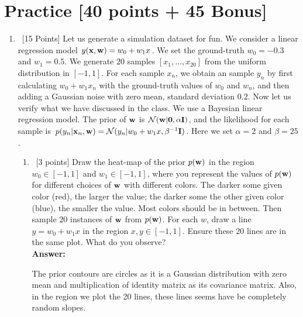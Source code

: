 \documentclass[12pt, fullpage,letterpaper]{article}
\def\red{\color{red}}
\def\blackblue{\color{black!40!blue}}
\begin{document}
\section*{Practice [40 points + 45 Bonus]}
\begin{enumerate}
	\item~[15 Points] Let us generate a simulation dataset for fun. We consider a linear regression model $y({\bf x}, {\bf w}) = w_0 + w_1 x$. We set the ground-truth $w_0 = -0.3$ and $w_1 = 0.5$. We generate $20$ samples $[x_1, \ldots, x_{20}]$ from the uniform distribution in $[-1, 1]$. For each sample $x_n$, we obtain an sample $y_n$ by first calculating $w_0 + w_1 x_n$ with the ground-truth values of $w_0$ and $w_n$, and then adding a Gaussian noise with zero mean, standard deviation $0.2$. Now let us verify what we have discussed in the class. We use a Bayesian linear regression model. The prior of ${\bf w}$ is $\mathcal{N}({\bf w}|{\bf 0}, \alpha {\bf I})$, and the likelihood for each sample is $p(y_n|{\bf x}_n, {\bf w}) = \mathcal{N}(y_n|w_0 + w_1x, \beta^{-1}{\bf I})$. Here we set $\alpha = 2$ and $\beta = 25$. 
	\begin{enumerate}
		\item~[3 points] Draw the heat-map of the prior $p({\bf w})$ in the region $w_0 \in [-1, 1]$ and $w_1 \in [-1, 1]$, where you represent the values of $p({\bf w})$ for different choices of ${\bf w}$ with different colors. The darker some given color (\eg red), the larger the value; the darker some the other given color (\eg blue), the smaller the value.  Most colors should be in between. Then sample $20$ instances of ${\bf w}$ from $p({\bf w})$. For each $w$, draw a line $y = w_0 + w_1x$ in the region $x, y \in [-1, 1]$. Ensure these $20$ lines are in the same plot. What do you observe?\\
	{\bf \red Answer:} {\blackblue 
	The prior contours are circles as it is a Gaussian distribution with zero mean and multiplication of identity matrix as its covariance matrix. 
	Also, in the region we plot the 20 lines, these lines seems have be completely random slopes.  
	\begin{figure}[H]
	\begin{center}
	\begin{minipage}{0.45\textwidth}

\end{minipage}
\end{center}
\end{figure}}
\end{enumerate}
\end{enumerate}
\end{document}
